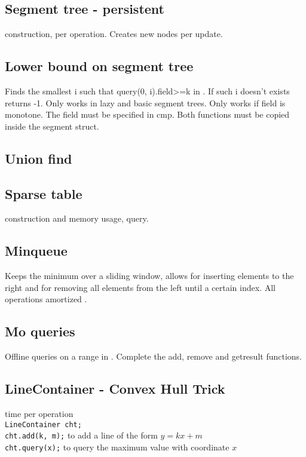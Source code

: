 \subsection{Segment tree - persistent}
 construction,  per operation.
Creates  new nodes per update.


\subsection{Lower bound on segment tree}
Finds the smallest i such that query(0, i).field>=k in .
If such i doesn't exists returns -1.
Only works in lazy and basic segment trees.
Only works if field is monotone. The field must be specified in cmp.
Both functions must be copied inside the segment struct.



\subsection{Union find}


\subsection{Sparse table}
 construction and memory usage,  query.


\subsection{Minqueue}
Keeps the minimum over a sliding window, allows for inserting elements to the right and for removing all elements from the left until a certain index. All operations amortized .


\subsection{Mo queries}
Offline queries on a range in . Complete the add, remove and getresult functions.


\subsection{LineContainer - Convex Hull Trick}

 time per operation \\
\verb|LineContainer cht;| \\
\verb|cht.add(k, m);| to add a line of the form $y = kx + m$ \\
\verb|cht.query(x);| to query the maximum value with coordinate $x$


